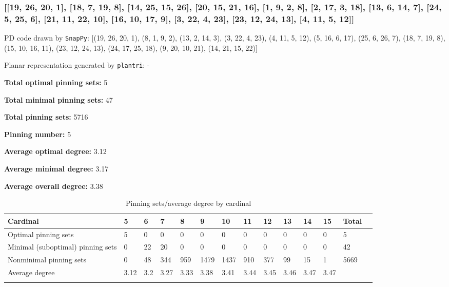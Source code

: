 \documentclass{article}%
\begin{document}
\newpage

\subsubsection{[[19, 26, 20, 1], [18, 7, 19, 8], [14, 25, 15, 26], [20, 15, 21, 16], [1, 9, 2, 8], [2, 17, 3, 18], [13, 6, 14, 7], [24, 5, 25, 6], [21, 11, 22, 10], [16, 10, 17, 9], [3, 22, 4, 23], [23, 12, 24, 13], [4, 11, 5, 12]]}

{\small\noindent PD code drawn by \texttt{SnapPy}: [(19, 26, 20, 1), (8, 1, 9, 2), (13, 2, 14, 3), (3, 22, 4, 23), (4, 11, 5, 12), (5, 16, 6, 17), (25, 6, 26, 7), (18, 7, 19, 8), (15, 10, 16, 11), (23, 12, 24, 13), (24, 17, 25, 18), (9, 20, 10, 21), (14, 21, 15, 22)]}

{\small\noindent Planar representation generated by \texttt{plantri}: -}

\begin{multicols}{2}
{\normalsize \noindent\textbf{Total optimal pinning sets:} 5

\noindent\textbf{Total minimal pinning sets:} 47

\noindent\textbf{Total pinning sets:} 5716

\noindent\textbf{Pinning number:} 5

}
\columnbreak

{\normalsize \noindent\textbf{Average optimal degree:} 3.12

\noindent\textbf{Average minimal degree:} 3.17

\noindent\textbf{Average overall degree:} 3.38

}
\end{multicols}

\begin{table}[ht]
	\caption{Pinning sets/average degree by cardinal}
	\centering
	\renewcommand{\arraystretch}{1.5}
	\begin{tabularx}{\textwidth}{lXXXXXXXXXXXXX}
		\toprule
			Cardinal & 5 & 6 & 7 & 8 & 9 & 10 & 11 & 12 & 13 & 14 & 15 & Total\\
			\hline
			Optimal pinning sets & 5 & 0 & 0 & 0 & 0 & 0 & 0 & 0 & 0 & 0 & 0 & 5 \\
			Minimal (suboptimal) pinning sets & 0 & 22 & 20 & 0 & 0 & 0 & 0 & 0 & 0 & 0 & 0 & 42 \\
			Nonminimal pinning sets & 0 & 48 & 344 & 959 & 1479 & 1437 & 910 & 377 & 99 & 15 & 1 & 5669 \\
			Average degree & 3.12 & 3.2 & 3.27 & 3.33 & 3.38 & 3.41 & 3.44 & 3.45 & 3.46 & 3.47 & 3.47 &  \\
		\bottomrule \\ 
	\end{tabularx}
\end{table}
\end{document}
